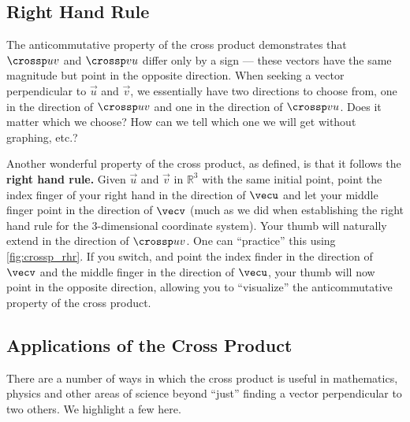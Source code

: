 \subsection*{Right Hand Rule}

The anticommutative property of the cross product demonstrates that $\crossp uv$ and $\crossp vu$ differ only by a sign --- these vectors have the same magnitude but point in the opposite direction. When seeking a vector perpendicular to $\vec u$ and $\vec v$, we essentially have two directions to choose from, one in the direction of $\crossp uv$ and one in the direction of $\crossp vu$. Does it matter which we choose? How can we tell which one we will get without graphing, etc.?

Another wonderful property of the cross product, as defined, is that it follows the \textbf{right hand rule.} Given $\vec u$ and $\vec v$ in $\mathbb{R}^3$ with the same initial point, point the index finger of your right hand in the direction of $\vecu$ and let your middle finger point in the direction of $\vecv$ (much as we did when establishing the right hand rule for the 3-dimensional coordinate system). Your thumb will naturally extend in the direction of $\crossp uv$. One can ``practice'' this using \autoref{fig:crossp_rhr}. If you switch, and point the index finder in the direction of $\vecv$ and the middle finger in the direction of $\vecu$, your thumb will now point in the opposite direction, allowing you to ``visualize'' the anticommutative property of the cross product.


\subsection*{Applications of the Cross Product}

There are a number of ways in which the cross product is useful in mathematics, physics and other areas of science beyond ``just'' finding a vector perpendicular to two others. We highlight a few here.

